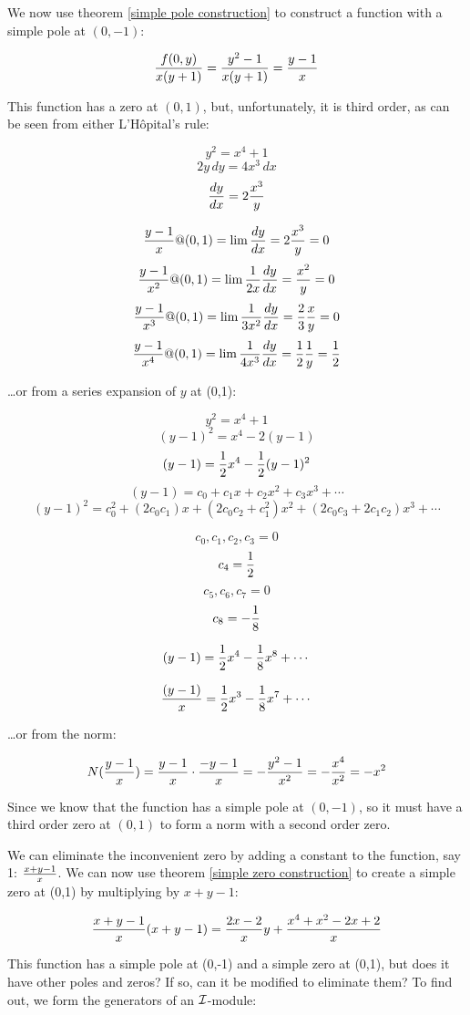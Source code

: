 We now use theorem \ref{simple pole construction} to construct a
function with a simple pole at $(0,-1)$:

$${{f(0,y)}\over{x(y+1)}} = {{y^2-1}\over{x(y+1)}} = {{y-1}\over{x}} $$

This function has a zero at $(0,1)$, but, unfortunately, it is third order,
as can be seen from either L'H\^opital's rule:

$$y^2=x^4+1$$
$$2y\,dy=4x^3\,dx$$
$${{dy}\over{dx}} = 2{x^3\over y}$$

$${{y-1}\over{x}} @ (0,1) = \lim {{dy}\over{dx}} = 2 {{x^3}\over y} = 0$$
$${{y-1}\over{x^2}} @ (0,1) = \lim {1\over{2x}}{{dy}\over{dx}} = {{x^2}\over y} = 0$$
$${{y-1}\over{x^3}} @ (0,1) = \lim {1\over{3x^2}}{{dy}\over{dx}} = {2\over3}{{x}\over y} = 0$$
$${{y-1}\over{x^4}} @ (0,1) = \lim {1\over{4x^3}}{{dy}\over{dx}} = {1\over2}{1\over y} = {1\over2}$$

\vfil\eject

\ldots or from a series expansion of $y$ at (0,1):

$$y^2 = x^4 + 1 $$
$$(y-1)^2 = x^4 - 2(y-1)$$
$$(y-1) = {1\over2}x^4 - {1\over2}(y-1)^2$$
$$(y-1) = c_0 + c_1 x + c_2 x^2 + c_3 x^3 + \cdots$$
$$(y-1)^2 = c_0^2 + (2 c_0 c_1) x + (2 c_0 c_2 + c_1^2) x^2 + (2 c_0 c_3 + 2 c_1 c_2) x^3 + \cdots$$

$$ c_0, c_1, c_2, c_3 = 0 $$
$$ c_4 = {1\over2}$$
$$ c_5, c_6, c_7 = 0 $$
$$ c_8 = -{1\over8} $$

$$ (y-1) = {1\over2} x^4 - {1\over8} x^8 + \cdots$$

$$ {(y-1)\over x} = {1\over2} x^3 - {1\over8} x^7 + \cdots$$

\ldots or from the norm:

$$N({{y-1}\over{x}}) = {{y-1}\over{x}} \cdot {{-y-1}\over{x}} = - {{y^2-1}\over{x^2}} = - {{x^4}\over{x^2}} = - x^2$$

Since we know that the function has a simple pole at $(0,-1)$, so it
must have a third order zero at $(0,1)$ to form a norm with a second
order zero.

We can eliminate the inconvenient zero by adding a constant to the
function, say 1: ${{x+y-1}\over x}$.  We can now use theorem
\ref{simple zero construction} to create a simple zero at
(0,1) by multiplying by $x+y-1$:

$${{x+y-1}\over x} (x+y-1) = {{2x-2}\over x} y + {{x^4+x^2-2x+2}\over x} $$

This function has a simple pole at (0,-1) and a simple zero at (0,1),
but does it have other poles and zeros?  If so, can it be modified to
eliminate them?  To find out, we form the generators of an ${\cal I}$-module:

